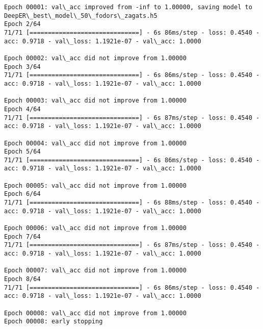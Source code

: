 \documentclass[11pt]{article}
\begin{document}
\begin{Verbatim}[commandchars=\\\{\}]
Epoch 00001: val\_acc improved from -inf to 1.00000, saving model to DeepER\_best\_model\_50\_fodors\_zagats.h5
Epoch 2/64
71/71 [==============================] - 6s 86ms/step - loss: 0.4540 - acc: 0.9718 - val\_loss: 1.1921e-07 - val\_acc: 1.0000

Epoch 00002: val\_acc did not improve from 1.00000
Epoch 3/64
71/71 [==============================] - 6s 86ms/step - loss: 0.4540 - acc: 0.9718 - val\_loss: 1.1921e-07 - val\_acc: 1.0000

Epoch 00003: val\_acc did not improve from 1.00000
Epoch 4/64
71/71 [==============================] - 6s 87ms/step - loss: 0.4540 - acc: 0.9718 - val\_loss: 1.1921e-07 - val\_acc: 1.0000

Epoch 00004: val\_acc did not improve from 1.00000
Epoch 5/64
71/71 [==============================] - 6s 86ms/step - loss: 0.4540 - acc: 0.9718 - val\_loss: 1.1921e-07 - val\_acc: 1.0000

Epoch 00005: val\_acc did not improve from 1.00000
Epoch 6/64
71/71 [==============================] - 6s 88ms/step - loss: 0.4540 - acc: 0.9718 - val\_loss: 1.1921e-07 - val\_acc: 1.0000

Epoch 00006: val\_acc did not improve from 1.00000
Epoch 7/64
71/71 [==============================] - 6s 87ms/step - loss: 0.4540 - acc: 0.9718 - val\_loss: 1.1921e-07 - val\_acc: 1.0000

Epoch 00007: val\_acc did not improve from 1.00000
Epoch 8/64
71/71 [==============================] - 6s 86ms/step - loss: 0.4540 - acc: 0.9718 - val\_loss: 1.1921e-07 - val\_acc: 1.0000

Epoch 00008: val\_acc did not improve from 1.00000
Epoch 00008: early stopping


\end{Verbatim}
\end{document}
